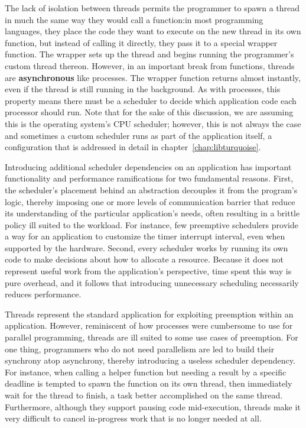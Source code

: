\documentclass[12pt,letterpaper,openright]{report}
\begin{document}
The lack of isolation between threads permits the programmer to spawn a thread in
much the same way they would call a function:\@ in most programming languages, they
place the code they want to execute on the new thread in its own function, but
instead of calling it directly, they pass it to a special wrapper function.  The
wrapper sets up the thread and begins running the programmer's custom thread thereon.
However, in an important break from functions, threads are \textbf{asynchronous} like
processes.  The wrapper function returns almost instantly, even if the thread is
still running in the background.  As with processes, this property means there must
be a scheduler to decide which application code each processor should run.  Note
that for the sake of this discussion, we are assuming this is the operating system's
CPU scheduler; however, this is not always the case and sometimes a custom scheduler
runs as part of the application itself, a configuration that is addressed in detail
in chapter~\ref{chap:libturquoise}.

Introducing additional scheduler dependencies on an application has important
functionality and performance ramifications for two fundamental reasons.  First, the
scheduler's placement behind an abstraction decouples it from the program's logic,
thereby imposing one or more levels of communication barrier that reduce its
understanding of the particular application's needs, often resulting in a brittle
policy ill suited to the workload.  For instance, few preemptive schedulers provide a
way for an application to customize the timer interrupt interval, even when supported
by the hardware.  Second, every scheduler works by running its own code to make
decisions about how to allocate a resource.  Because it does not represent useful
work from the application's perspective, time spent this way is pure overhead, and it
follows that introducing unnecessary scheduling necessarily reduces performance.

Threads represent the standard application for exploiting preemption within an
application.  However, reminiscent of how processes were cumbersome to use for
parallel programming, threads are ill suited to some use cases of preemption.  For
one thing, programmers who do not need parallelism are led to build their synchrony
atop asynchrony, thereby introducing a useless scheduler dependency.  For instance,
when calling a helper function but needing a result by a specific deadline is tempted
to spawn the function on its own thread, then immediately wait for the thread to
finish, a task better accomplished on the same thread.  Furthermore, although they
support pausing code mid-execution, threads make it very difficult to cancel
in-progress work that is no longer needed at all.
\end{document}
